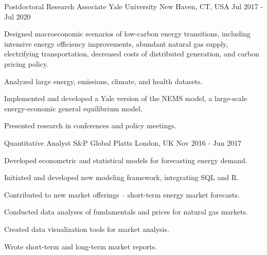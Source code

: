 \begin{cventries}
    \cventry
    {Postdoctoral Research Associate} %
    {Yale University} %
    {New Haven, CT, USA} %
    {Jul 2017 - Jul 2020} %
    {
        \begin{cvitems} %
            \item {Designed macroeconomic scenarios of low-carbon energy transitions, including intensive energy efficiency improvements, abundant natural gas supply, electrifying transportation, decreased costs of distributed generation, and carbon pricing policy.}
            \item {Analyzed large energy, emissions, climate, and health datasets.}
            \item {Implemented and developed a Yale version of the NEMS model, a large-scale energy-economic general equilibrium model.}
            \item {Presented research in conferences and policy meetings.}
        \end{cvitems}
    }

    \cventry
    {Quantitative Analyst} %
    {S\&P Global Platts} %
    {London, UK} %
    {Nov 2016 - Jun 2017} %
    {
        \begin{cvitems} %
            \item {Developed econometric and statistical models for forecasting energy demand.}
            \item {Initiated and developed new modeling framework, integrating SQL and R.}
            \item {Contributed to new market offerings -- short-term energy market forecasts.}
            \item {Conducted data analyses of fundamentals and prices for natural gas markets.}
            \item {Created data visualization tools for market analysis.}
            \item {Wrote short-term and long-term market reports.}
        \end{cvitems}
    }


\end{cventries}
